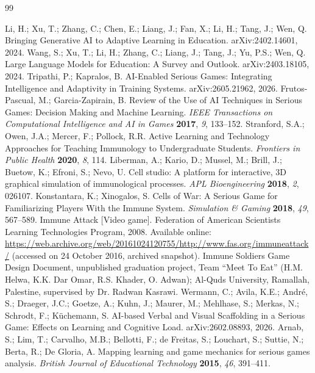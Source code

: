 \documentclass[11pt]{article}
\begin{document}
\begin{thebibliography}{99}

 Li, H.; Xu, T.; Zhang, C.; Chen, E.; Liang, J.; Fan, X.; Li, H.; Tang, J.; Wen, Q. Bringing Generative AI to Adaptive Learning in Education. arXiv:2402.14601, 2024.
 Wang, S.; Xu, T.; Li, H.; Zhang, C.; Liang, J.; Tang, J.; Yu, P.S.; Wen, Q. Large Language Models for Education: A Survey and Outlook. arXiv:2403.18105, 2024.
 Tripathi, P.; Kapralos, B. AI-Enabled Serious Games: Integrating Intelligence and Adaptivity in Training Systems. arXiv:2605.21962, 2026.
 Frutos-Pascual, M.; Garcia-Zapirain, B. Review of the Use of AI Techniques in Serious Games: Decision Making and Machine Learning. \textit{IEEE Transactions on Computational Intelligence and AI in Games} \textbf{2017}, \textit{9}, 133--152.
 Stranford, S.A.; Owen, J.A.; Mercer, F.; Pollock, R.R. Active Learning and Technology Approaches for Teaching Immunology to Undergraduate Students. \textit{Frontiers in Public Health} \textbf{2020}, \textit{8}, 114.
 Liberman, A.; Kario, D.; Mussel, M.; Brill, J.; Buetow, K.; Efroni, S.; Nevo, U. Cell studio: A platform for interactive, 3D graphical simulation of immunological processes. \textit{APL Bioengineering} \textbf{2018}, \textit{2}, 026107.
 Konstantara, K.; Xinogalos, S. Cells of War: A Serious Game for Familiarizing Players With the Immune System. \textit{Simulation \& Gaming} \textbf{2018}, \textit{49}, 567--589.
 Immune Attack [Video game]. Federation of American Scientists Learning Technologies Program, 2008. Available online: \url{https://web.archive.org/web/20161024120755/http://www.fas.org/immuneattack/} (accessed on 24 October 2016, archived snapshot).
 Immune Soldiers Game Design Document, unpublished graduation project, Team ``Meet To Eat'' (H.M. Helwa, K.K. Dar Omar, R.S. Khader, O. Adwan); Al-Quds University, Ramallah, Palestine, supervised by Dr. Radwan Kasrawi. %
 Wermann, C.; Avila, K.E.; Andr\'e, S.; Draeger, J.C.; Goetze, A.; Kuhn, J.; Maurer, M.; Mehlhase, S.; Merkas, N.; Schrodt, F.; K\"uchemann, S. AI-based Verbal and Visual Scaffolding in a Serious Game: Effects on Learning and Cognitive Load. arXiv:2602.08893, 2026.
 Arnab, S.; Lim, T.; Carvalho, M.B.; Bellotti, F.; de Freitas, S.; Louchart, S.; Suttie, N.; Berta, R.; De Gloria, A. Mapping learning and game mechanics for serious games analysis. \textit{British Journal of Educational Technology} \textbf{2015}, \textit{46}, 391--411.

\end{thebibliography}
\end{document}
